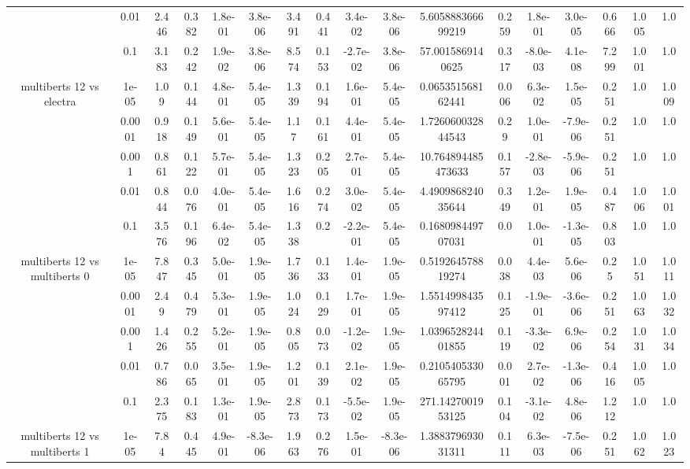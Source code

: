 \begin{tabular}{|c|c|c|c|c|c|c|c|c|c|c|c|c|c|c|c|c|}
 & 0.01 & 2.446 & 0.382 & 1.8e-01 & 3.8e-06 & 3.491 & 0.441 & 3.4e-02 & 3.8e-06 & 5.605888366699219 & 0.259 & 1.8e-01 & 3.0e-05 & 0.666 & 1.005 & 1.0 \\
 & 0.1 & 3.183 & 0.242 & 1.9e-02 & 3.8e-06 & 8.574 & 0.153 & -2.7e-02 & 3.8e-06 & 57.0015869140625 & 0.317 & -8.0e-03 & 4.1e-08 & 7.299 & 1.001 & 1.0 \\
\hline
\multirow{5}{*}{multiberts 12 vs electra } & 1e-05 & 1.09 & 0.144 & 4.8e-01 & 5.4e-05 & 1.339 & 0.194 & 1.6e-01 & 5.4e-05 & 0.065351568162441 & 0.006 & 6.3e-02 & 1.5e-05 & 0.251 & 1.0 & 1.009 \\
 & 0.0001 & 0.918 & 0.149 & 5.6e-01 & 5.4e-05 & 1.17 & 0.161 & 4.4e-01 & 5.4e-05 & 1.726060032844543 & 0.29 & 1.0e-01 & -7.9e-06 & 0.251 & 1.0 & 1.0 \\
 & 0.001 & 0.861 & 0.122 & 5.7e-01 & 5.4e-05 & 1.323 & 0.205 & 2.7e-01 & 5.4e-05 & 10.764894485473633 & 0.157 & -2.8e-03 & -5.9e-06 & 0.251 & 1.0 & 1.0 \\
 & 0.01 & 0.844 & 0.076 & 4.0e-01 & 5.4e-05 & 1.616 & 0.274 & 3.0e-02 & 5.4e-05 & 4.490986824035644 & 0.349 & 1.2e-01 & 1.9e-05 & 0.487 & 1.006 & 1.001 \\
 & 0.1 & 3.576 & 0.196 & 6.4e-02 & 5.4e-05 & 1.338 & 0.2 & -2.2e-01 & 5.4e-05 & 0.168098449707031 & 0.0 & 1.0e-01 & -1.3e-05 & 0.803 & 1.0 & 1.0 \\
\hline
\multirow{5}{*}{multiberts 12 vs multiberts 0} & 1e-05 & 7.847 & 0.345 & 5.0e-01 & 1.9e-05 & 1.736 & 0.133 & 1.4e-01 & 1.9e-05 & 0.519264578819274 & 0.038 & 4.4e-03 & 5.6e-06 & 0.25 & 1.051 & 1.011 \\
 & 0.0001 & 2.49 & 0.479 & 5.3e-01 & 1.9e-05 & 1.024 & 0.129 & 1.7e-01 & 1.9e-05 & 1.551499843597412 & 0.125 & -1.9e-01 & -3.6e-06 & 0.251 & 1.063 & 1.032 \\
 & 0.001 & 1.426 & 0.255 & 5.2e-01 & 1.9e-05 & 0.805 & 0.073 & -1.2e-02 & 1.9e-05 & 1.039652824401855 & 0.119 & -3.3e-02 & 6.9e-06 & 0.254 & 1.031 & 1.034 \\
 & 0.01 & 0.786 & 0.065 & 3.5e-01 & 1.9e-05 & 1.201 & 0.139 & 2.1e-02 & 1.9e-05 & 0.210540533065795 & 0.001 & 2.7e-02 & -1.3e-06 & 0.416 & 1.005 & 1.0 \\
 & 0.1 & 2.375 & 0.183 & 1.3e-01 & 1.9e-05 & 2.873 & 0.173 & -5.5e-02 & 1.9e-05 & 271.1427001953125 & 0.104 & -3.1e-02 & 4.8e-06 & 1.212 & 1.0 & 1.0 \\
\hline
\multirow{5}{*}{multiberts 12 vs multiberts 1} & 1e-05 & 7.84 & 0.445 & 4.9e-01 & -8.3e-06 & 1.963 & 0.276 & 1.5e-01 & -8.3e-06 & 1.388379693031311 & 0.111 & 6.3e-03 & -7.5e-06 & 0.251 & 1.062 & 1.023 \\

\end{tabular}
